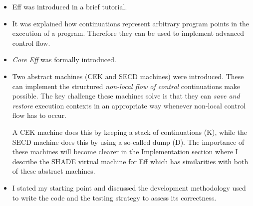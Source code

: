 \documentclass[class=article, crop=false]{standalone}
\begin{document}
\begin{itemize}
\item Eff was introduced in a brief tutorial.
\item It was explained how continuations represent arbitrary program points
        in the execution of a program. Therefore they can be used to implement
        advanced control flow.
\item \emph{Core Eff} was formally introduced.

\item Two abstract machines (CEK and SECD machines) were introduced.
    These can implement the structured \emph{non-local flow of control}
    continuations make possible. The key challenge these machines solve is that
    they can \emph{save and restore} execution contexts in an appropriate way
    whenever non-local control flow has to occur.

    A CEK machine does this by keeping a stack of continuations (K), while the
    SECD machine does this by using a so-called dump (D). The importance of
    these machines will become clearer in the Implementation section where I
    describe the SHADE virtual machine for Eff which has similarities with both
    of these abstract machines.

\item I stated my starting point and discussed the development methodology
    used to write the code and the testing strategy to assess its correctness.
\end{itemize}

\ifstandalone
{}

\fi
\end{document}
